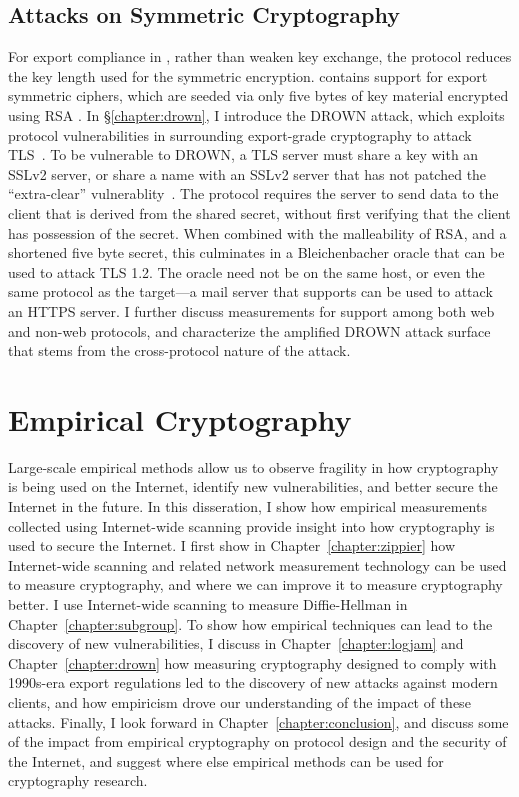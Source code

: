 \subsection{Attacks on Symmetric Cryptography}

For export compliance in \ssltwo, rather than weaken key exchange, the
protocol reduces the key length used for the symmetric encryption.
\ssltwo contains support for export symmetric ciphers, which are seeded via
only five bytes of key material encrypted using RSA \PKCS. In
\S\ref{chapter:drown}, I introduce the DROWN attack, which exploits protocol
vulnerabilities in \ssltwo surrounding export-grade cryptography to attack
TLS~\cite{drown-2016}. To be vulnerable to DROWN, a TLS server must share a
key with an SSLv2 server, or share a name with an SSLv2 server that has not
patched the ``extra-clear'' vulnerablity~\cite{drown-2016,cve-2016-0701}.
The \ssltwo protocol requires the server to send data to the client that is
derived from the shared secret, without first verifying that the client has
possession of the secret. When combined with the malleability of RSA, and a
shortened five byte secret, this culminates in a Bleichenbacher oracle that
can be used to attack TLS 1.2. The \ssltwo oracle need not be on the same
host, or even the same protocol as the target---a mail server that supports
\starttls can be used to attack an HTTPS server. I further discuss
measurements for \ssltwo support among both web and non-web protocols, and
characterize the amplified DROWN attack surface that stems from the
cross-protocol nature of the attack.

\section{Empirical Cryptography}

Large-scale empirical methods allow us to observe fragility in how
cryptography is being used on the Internet, identify new vulnerabilities, and
better secure the Internet in the future. In this disseration, I show how
empirical measurements collected using Internet-wide scanning provide insight
into how cryptography is used to secure the Internet. I first show in
Chapter~\ref{chapter:zippier} how Internet-wide scanning and related network
measurement technology can be used to measure cryptography, and where we can
improve it to measure cryptography better. I use Internet-wide scanning to
measure Diffie-Hellman in Chapter~\ref{chapter:subgroup}. To show how
empirical techniques can lead to the discovery of new vulnerabilities, I
discuss in Chapter~\ref{chapter:logjam} and Chapter~\ref{chapter:drown} how
measuring cryptography designed to comply with 1990s-era export regulations
led to the discovery of new attacks against modern clients, and how
empiricism drove our understanding of the impact of these attacks. Finally, I look
forward in Chapter~\ref{chapter:conclusion}, and discuss some of the impact from
empirical cryptography on protocol design and the security of the Internet, and suggest
where else empirical methods can be used for cryptography research.

